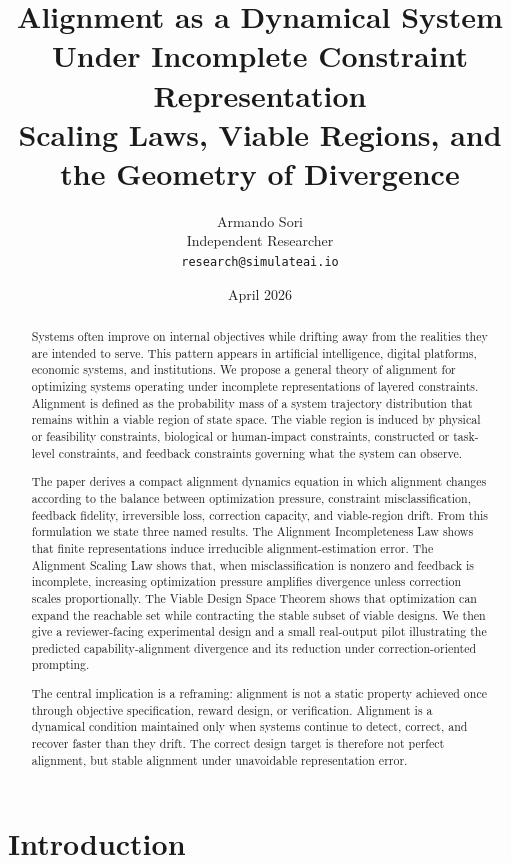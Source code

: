 \documentclass[11pt]{article}
\title{\textbf{Alignment as a Dynamical System Under Incomplete Constraint Representation}\\
\large Scaling Laws, Viable Regions, and the Geometry of Divergence}
\author{Armando Sori\\
Independent Researcher\\
\texttt{research@simulateai.io}}
\date{April 2026}
\begin{document}
\maketitle

\begin{abstract}
Systems often improve on internal objectives while drifting away from the realities they are intended to serve. This pattern appears in artificial intelligence, digital platforms, economic systems, and institutions. We propose a general theory of alignment for optimizing systems operating under incomplete representations of layered constraints. Alignment is defined as the probability mass of a system trajectory distribution that remains within a viable region of state space. The viable region is induced by physical or feasibility constraints, biological or human-impact constraints, constructed or task-level constraints, and feedback constraints governing what the system can observe.

The paper derives a compact alignment dynamics equation in which alignment changes according to the balance between optimization pressure, constraint misclassification, feedback fidelity, irreversible loss, correction capacity, and viable-region drift. From this formulation we state three named results. The Alignment Incompleteness Law shows that finite representations induce irreducible alignment-estimation error. The Alignment Scaling Law shows that, when misclassification is nonzero and feedback is incomplete, increasing optimization pressure amplifies divergence unless correction scales proportionally. The Viable Design Space Theorem shows that optimization can expand the reachable set while contracting the stable subset of viable designs. We then give a reviewer-facing experimental design and a small real-output pilot illustrating the predicted capability-alignment divergence and its reduction under correction-oriented prompting.

The central implication is a reframing: alignment is not a static property achieved once through objective specification, reward design, or verification. Alignment is a dynamical condition maintained only when systems continue to detect, correct, and recover faster than they drift. The correct design target is therefore not perfect alignment, but stable alignment under unavoidable representation error.
\end{abstract}

\tableofcontents
\newpage

\section{Introduction}
\end{document}
